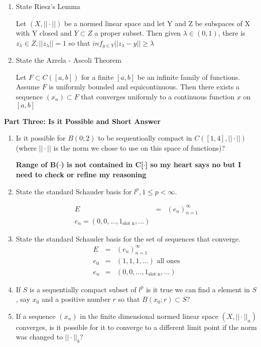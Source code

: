 \documentclass[11pt]{SelfArxOneColBMN}
\begin{document}
\begin{enumerate}
  \item State Riesz's Lemma
  \begin{solution}
    Let $(X,||\cdot||)$ be a normed linear space and let Y and Z be subspaces of X with Y closed and $Y \subset Z$ a proper subset. Then given $\lambda \in (0,1)$, there is $z_\lambda \in Z, ||z_\lambda|| = 1$ so that $inf_{y \in Y}||z_\lambda - y|| \geq \lambda$
  \end{solution}
  \item State the Azrela - Ascoli Theorem
  \begin{solution}
    Let $F \subset C([a,b])$ for a finite $[a,b]$ be an infinite family of functions. Assume $F$ is uniformly bounded and equicontinuous. Then there exists a sequence $(x_n) \subset F$ that converges uniformly to a continuous function $x$ on $[a,b]$
  \end{solution}
\end{enumerate}

\textbf{Part Three: Is it Possible and Short Answer}
\begin{enumerate}
  \item Is it possible for $B(0;2)$ to be sequentioally compact in $C([1,4],||\cdot||)$ (where $||\cdot||$ is the norm we chose to use on this space of functions)?
  \begin{solution}
    \textbf{Range of B($\cdot$) is not contained in C[$\cdot$] so my heart says no but I need to check or refine my reasoning}
  \end{solution}
  \item State the standard Schauder basis for $l^p, 1 \leq p < \infty$.
  \begin{solution}
    \begin{eqnarray*}
      E &=& (e_n)^\infty_{n=1}\\
      e_n = (0, 0,...,1_{\text{slot n}},...)
    \end{eqnarray*}
  \end{solution}
  \item State the standard Schauder basis for the set of sequences that converge.
  \begin{eqnarray*}
     E &=& (e_n)^\infty_{n=1}\\
     e_0 &=& (1,1,1,...) \text{ all ones}\\
     e_n &=& (0, 0,...,1_{\text{slot n}},...)
  \end{eqnarray*}
  \item If $S$ is a sequentially compact subset of $l^p$ is it true we can find a element in $S$, say $x_0$ and a positive number $r$ so that $B(x_0;r) \subset S$?
  \item If a sequence $(x_n)$ in the finite dimensional normed linear space $(X,||\cdot||_a)$ converges, is it possible for it to converge to a different limit point if the norm was changed to $||\cdot||_b$?
\end{enumerate}
\end{document}
